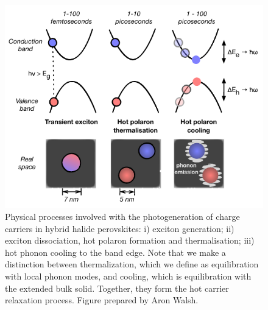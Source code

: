 \begin{figure}[h!]
\centering
  \includegraphics[width=0.7\columnwidth]{figures/ch5/f1.pdf}
  \caption[Schematic of the hot carrier cooling model]{Physical processes involved with the photogeneration of charge carriers in hybrid halide perovskites: i) exciton generation; ii) exciton dissociation, hot polaron formation and thermalisation; iii) hot phonon cooling to the band edge. Note that we make a distinction between thermalization, which we define as equilibration with local phonon modes, and cooling, which is equilibration with the extended bulk solid. Together, they form the hot carrier relaxation process. Figure prepared by Aron Walsh.}
\label{cooling_schematic}
\end{figure}

